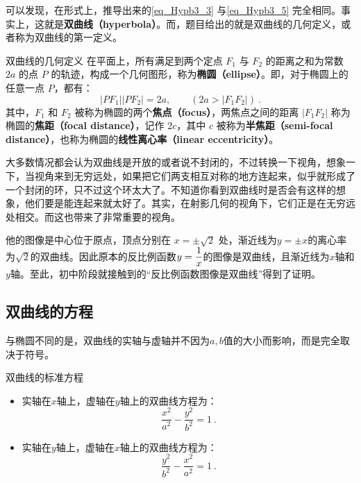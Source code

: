 可以发现，在形式上，推导出来的\autoref{eq_Hypb3_3} 与\autoref{eq_Hypb3_5} 完全相同。事实上，这就是\textbf{双曲线（hyperbola）}。而，题目给出的就是双曲线的几何定义，或者称为双曲线的第一定义。

\begin{definition}{双曲线的几何定义}
在平面上，所有满足到两个定点 $F_1$ 与 $F_2$ 的距离之和为常数 $2a$ 的点 $P$ 的轨迹，构成一个几何图形，称为\textbf{椭圆（ellipse）}。即，对于椭圆上的任意一点 $P$，都有：
\begin{equation}
|PF_1|  |PF_2| = 2a ,\qquad(2a>|F_1F_2|)~.
\end{equation}
其中，$F_1$ 和 $F_2$ 被称为椭圆的两个\textbf{焦点（focus）}，两焦点之间的距离 $|F_1F_2|$ 称为椭圆的\textbf{焦距（focal distance）}，记作 $2c$，其中 $c$ 被称为\textbf{半焦距（semi-focal distance）}，也称为椭圆的\textbf{线性离心率（linear eccentricity）}。
\end{definition}


大多数情况都会认为双曲线是开放的或者说不封闭的，不过转换一下视角，想象一下，当视角来到无穷远处，如果把它们两支相互对称的地方连起来，似乎就形成了一个封闭的环，只不过这个环太大了。不知道你看到双曲线时是否会有这样的想象，他们要是能连起来就太好了。其实，在射影几何的视角下，它们正是在无穷远处相交。而这也带来了非常重要的视角。
 

他的图像是中心位于原点，顶点分别在 $x = \pm \sqrt{2}$ 处，渐近线为$y = \pm x$的离心率为$\sqrt{2}$的双曲线。因此原本的反比例函数$\displaystyle y={1\over x}$的图像是双曲线，且渐近线为$x$轴和$y$轴。至此，初中阶段就接触到的“反比例函数图像是双曲线”得到了证明。

\subsection{双曲线的方程}

与椭圆不同的是，双曲线的实轴与虚轴并不因为$a,b$值的大小而影响，而是完全取决于符号。
\begin{theorem}{双曲线的标准方程}
\begin{itemize}
\item 实轴在$x$轴上，虚轴在$y$轴上的双曲线方程为：
\begin{equation}\label{eq_Hypb3_4}
\frac{x^2}{a^2} - \frac{y^2}{b^2} = 1~.
\end{equation}
\item 实轴在$y$轴上，虚轴在$x$轴上的双曲线方程为：
\begin{equation}
\frac{y^2}{b^2} -\frac{x^2}{a^2}  = 1~.
\end{equation}
\end{itemize}
\end{theorem}

